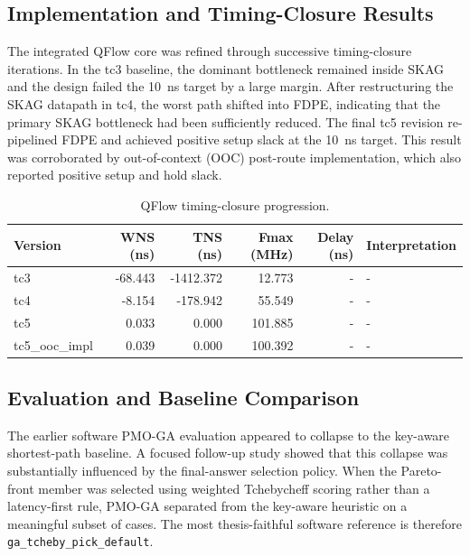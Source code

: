 \subsection{Implementation and Timing-Closure Results}
The integrated QFlow core was refined through successive timing-closure iterations. In the tc3 baseline, the dominant bottleneck remained inside SKAG and the design failed the 10~ns target by a large margin. After restructuring the SKAG datapath in tc4, the worst path shifted into FDPE, indicating that the primary SKAG bottleneck had been sufficiently reduced. The final tc5 revision re-pipelined FDPE and achieved positive setup slack at the 10~ns target. This result was corroborated by out-of-context (OOC) post-route implementation, which also reported positive setup and hold slack.

\begin{table}[t]
\centering
\caption{QFlow timing-closure progression.}
\begin{tabular}{lrrrrl}
\hline
Version & WNS (ns) & TNS (ns) & Fmax (MHz) & Delay (ns) & Interpretation \\ 
\hline
tc3 & -68.443 & -1412.372 & 12.773 & - & - \\ 
tc4 & -8.154 & -178.942 & 55.549 & - & - \\ 
tc5 & 0.033 & 0.000 & 101.885 & - & - \\ 
tc5\_ooc\_impl & 0.039 & 0.000 & 100.392 & - & - \\ 
\hline
\end{tabular}
\end{table}

\subsection{Evaluation and Baseline Comparison}
The earlier software PMO-GA evaluation appeared to collapse to the key-aware shortest-path baseline. A focused follow-up study showed that this collapse was substantially influenced by the final-answer selection policy. When the Pareto-front member was selected using weighted Tchebycheff scoring rather than a latency-first rule, PMO-GA separated from the key-aware heuristic on a meaningful subset of cases. The most thesis-faithful software reference is therefore \texttt{ga\_tcheby\_pick\_default}.


